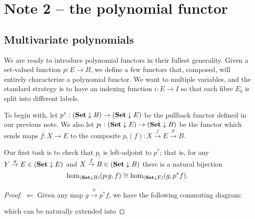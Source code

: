 
\section{Note 2 -- the polynomial functor}

\subsection{Multivariate polynomials}

We are ready to introduce polynomial functors in their fullest generality. Given a set-valued function $p:E\to B$, we define a few functors that, composed, will entirely characterize a polynomial functor. We want to multiple variables, and the standard strategy is to have an indexing function $i:E\to I$ so that each fibre $E_b$ is split into different labels.

To begin with, let $p^*:(\mathbf{Set}\downarrow B)\to(\mathbf{Set}\downarrow E)$ be the pullback functor defined in our previous note. We also let $p_!:(\mathbf{Set}\downarrow E)\to(\mathbf{Set}\downarrow B)$ be the functor which sends maps $f:X\to E$ to the composite $p_!(f):X\overset{f}{\to} E\overset{p}{\to} B$.

Our first task is to check that $p_!$ is left-adjoint to $p^*$; that is, for any $Y\overset{g}{\to} E\in(\mathbf{Set}\downarrow E)$ and $X\overset{f}{\to} B\in(\mathbf{Set}\downarrow B)$ there is a natural bijection
\[
	\hom_{(\mathbf{Set}\downarrow B)}(p_!g,f)\cong\hom_{(\mathbf{Set}\downarrow E)}(g,p^*f).
\]

\begin{proof}
	$\Longleftarrow$ Given any map $g\overset{\phi}{\to} p^*f$, we have the following commuting diagram:


 	which can be naturally extended into


\end{proof}
